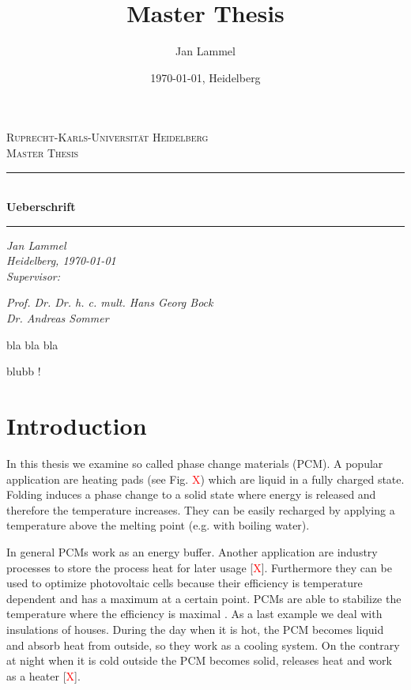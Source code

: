 \documentclass{scrartcl}[12pt, halfparskip]
\title{Master Thesis}
\author{Jan Lammel}
\date{\today{}, Heidelberg}
\begin{document}
\begin{titlepage}
	\begin{center}
	
	\textsc{\large Ruprecht-Karls-Universit\"{a}t Heidelberg} \\[0.5cm]
	\textsc{\large Master Thesis}\\[1cm]
	
	\newcommand{\HRule}{\rule{\linewidth}{0.5mm}}
	\HRule \\[0.4cm]
	\huge \bfseries Ueberschrift
	\HRule 
	
	\vspace{11cm}
	
	\Large \textit{Jan Lammel }\\
	\Large \textit{Heidelberg, \today }\\ \vspace{0.5cm}
	\Large \textit{Supervisor:}
	
	\Large \textit{Prof. Dr. Dr. h. c. mult. Hans Georg Bock}\\
	\Large \textit{Dr. Andreas Sommer}
	
	\end{center}
\end{titlepage}

\newpage

\tableofcontents 
\newpage

 

 bla bla bla
 
 
 \newpage

blubb !

\newpage
{}

\section{Introduction}
In this thesis we examine so called phase change materials (PCM). A popular application are heating pads (see Fig. \textcolor{red}{X}) which are liquid in a fully charged state. Folding induces a phase change to a solid state where energy is released and therefore the temperature increases. They can be easily recharged by applying a temperature above the melting point (e.g. with boiling water). 

In general PCMs work as an energy buffer. Another application are industry processes to store the process heat for later usage [\textcolor{red}{X}]. Furthermore they can be used to optimize photovoltaic cells because their efficiency is temperature dependent and has a maximum at a certain point. PCMs are able to stabilize the temperature where the efficiency is maximal \cite{pcm_solar_cells}. 
As a last example we deal with insulations of houses. During the day when it is hot, the PCM becomes liquid and absorb heat from outside, so they work as a cooling system. On the contrary at night when it is cold outside the PCM becomes solid, releases heat and work as a heater [\textcolor{red}{X}]. 
\end{document}
